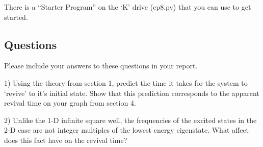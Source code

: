 \documentclass[11pt]{article} %
\begin{document}
There is a ``Starter Program'' on the `K' drive (cp8.py) that you can use to get started.

\subsection*{Questions}

Please include your answers to these questions in your report.

1) Using the theory from section 1, predict the time it takes for the system to `revive' to it's initial state. Show that this prediction corresponds to the apparent revival time on your graph from section 4.

2) Unlike the 1-D infinite square well, the frequencies of the excited states in the 2-D case are not integer multiples of the lowest energy eigenstate. What affect does this fact have on the revival time?
\end{document}
